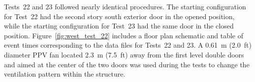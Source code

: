 Tests~22 and 23 followed nearly identical procedures. The starting configuration for Test~22 had the second story south exterior door in the opened position, while the starting configuration for Test~23 had the same door in the closed position. Figure~\ref{fig:west_test_22} includes a floor plan schematic and table of event times corresponding to the data files for Tests~22 and 23. A 0.61~m (2.0~ft) diameter PPV fan located 2.3~m (7.5~ft) away from the first level double doors and aimed at the center of the two doors was used during the tests to change the ventilation pattern within the structure.

